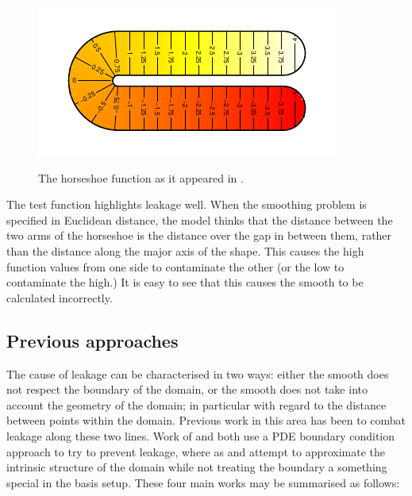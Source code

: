 \begin{figure}
\centering
\includegraphics{intro/figs/orig-fs.pdf}\\
\caption{The horseshoe function as it appeared in \cite{ramsay}.}
\label{orig-fs}
\end{figure}

The test function highlights leakage well. When the smoothing problem is specified in Euclidean distance, the model thinks that the distance between the two arms of the horseshoe is the distance over the gap in between them, rather than the distance along the major axis of the shape. This causes the high function values from one side to contaminate the other (or the low to contaminate the high.) It is easy to see that this causes the smooth to be calculated incorrectly.
		
\subsection{Previous approaches}

The cause of leakage can be characterised in two ways: either the smooth does not respect the boundary of the domain, or the smooth does not take into account the geometry of the domain; in particular with regard to the distance between points within the domain. Previous work in this area has been to combat leakage along these two lines. Work of \cite{ramsay} and \cite{soap} both use a PDE boundary condition approach to try to prevent leakage, where as \cite{wangranalli} and \cite{eilerstalk}  attempt to approximate the intrinsic structure of the domain while not treating the boundary a something special in the basis setup. These four main works may be summarised as follows:

